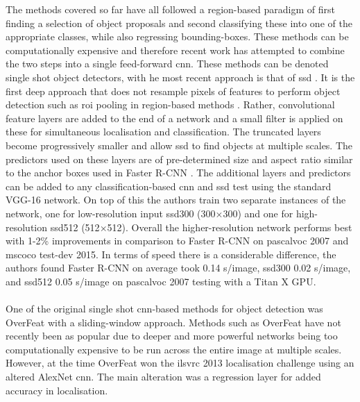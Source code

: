 The methods covered so far have all followed a region-based paradigm of first finding a selection of object proposals and second classifying these into one of the appropriate classes, while also regressing bounding-boxes. These methods can be computationally expensive and therefore recent work has attempted to combine the two steps into a single feed-forward \gls{cnn}. These methods can be denoted single shot object detectors, with he most recent approach is that of \gls{ssd} \cite{ssd}. It is the first deep approach that does not resample pixels of features to perform object detection such as \gls{roi} pooling in region-based methods \cite{fastrcnn} \cite{fasterrcnn}. Rather, convolutional feature layers are added to the end of a network and a small filter is applied on these for simultaneous localisation and classification. The truncated layers become progressively smaller and allow \gls{ssd} to find objects at multiple scales. The predictors used on these layers are of pre-determined size and aspect ratio similar to the anchor boxes used in Faster R-CNN \cite{fasterrcnn}. The additional layers and predictors can be added to any classification-based \gls{cnn} and \gls{ssd} test using the standard VGG-16 network. On top of this the authors train two separate instances of the network, one for low-resolution input \gls{ssd}300 (300$\times$300) and one for high-resolution \gls{ssd}512 (512$\times$512). Overall the higher-resolution network performs best with 1-2\% improvements in comparison to Faster R-CNN on \gls{pascalvoc} 2007 and \gls{mscoco} test-dev 2015. In terms of speed there is a considerable difference, the authors found Faster R-CNN on average took 0.14 s/image, \gls{ssd}300 0.02 s/image, and \gls{ssd}512 0.05 s/image on \gls{pascalvoc} 2007 testing with a Titan X GPU. 
\\\\
One of the original single shot \gls{cnn}-based methods for object detection was OverFeat \cite{overfeat} with a sliding-window approach. Methods such as OverFeat have not recently been as popular due to deeper and more powerful networks being too computationally expensive to be run across the entire image at multiple scales. However, at the time OverFeat won the \gls{ilsvrc} 2013 localisation challenge using an altered AlexNet \cite{alexnet} \gls{cnn}. The main alteration was a regression layer for added accuracy in localisation.
\\\\
